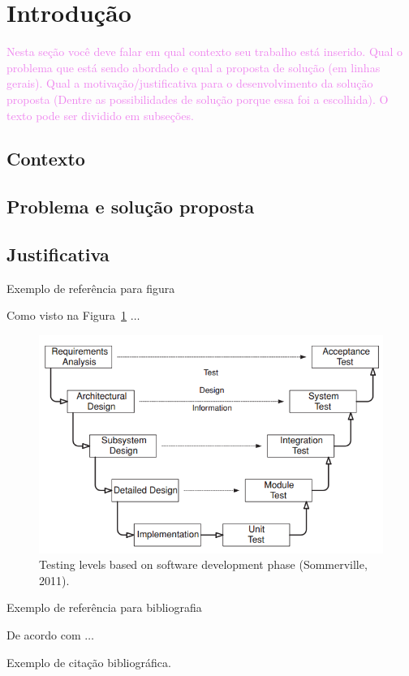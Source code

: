 \newpage
\section{Introdução}
\label{sec:introducao}

\textcolor{violet}{Nesta seção você deve falar em  qual contexto seu trabalho está inserido. 
Qual o problema que está sendo abordado e qual a proposta de solução (em linhas gerais). 
Qual a motivação/justificativa para o desenvolvimento da solução proposta (Dentre as possibilidades de solução porque essa foi a escolhida). O texto pode ser dividido em subseções.} 
\subsection{Contexto}
\subsection{Problema e solução proposta}
\subsection{Justificativa}

Exemplo de referência para figura

Como visto na Figura~\ref{fig:lifecycle_phase} $\ldots$

\begin{figure}[ht]
    \center
    \includegraphics[scale=0.7]{images/lifecycle_phase.png}
    \caption{Testing levels based on software development phase (Sommerville, 2011).}
    \label{fig:lifecycle_phase}
\end{figure}

Exemplo de referência para bibliografia

De acordo com \cite{sommerville2011software} $\ldots$

Exemplo de citação bibliográfica.\cite{WCAG}
